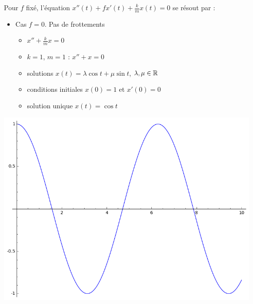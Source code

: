 \begin{frame}
\end{frame}


\begin{frame}

Pour $f$ fixé, l'équation $x''(t) +f x'(t)+ \frac{k}{m} x(t) = 0$ se résout par : \\

{\small
\centerline{}
}

\pause
\medskip

\begin{minipage}{0.7\textwidth}
\begin{itemize}
  \item Cas $f=0$. Pas de frottements
  \pause
  \begin{itemize}
    \item $x''+ \frac{k}{m} x = 0$
    \pause
    \item $k=1$, $m=1$ : $x''+ x = 0$
    \pause
    \item solutions $x(t) = \lambda \cos t + \mu \sin t$, $\lambda,\mu \in\mathbb{R}$
    \pause
    \item conditions initiales $x(0)=1$ et $x'(0)=0$
    \pause
    \item solution unique  $x(t) = \cos t$
  \end{itemize}  
\end{itemize}
\end{minipage}\pause
\begin{minipage}{0.29\textwidth}
\includegraphics[scale=0.15]{figures/equadiff-ressort1.png}
\end{minipage}


\end{frame}
